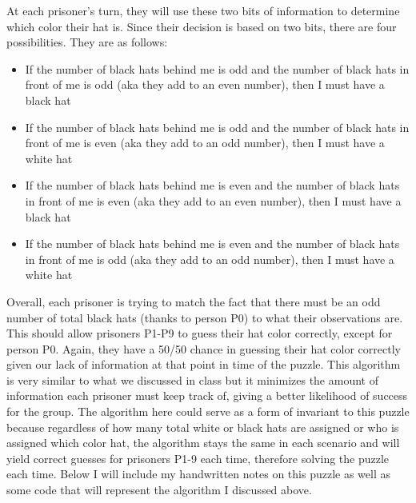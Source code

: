 \documentclass{article}
\theoremstyle{theorem}
\theoremstyle{definition}
\theoremstyle{remark}
\begin{document}
At each prisoner's turn, they will use these two bits of information to determine which color their hat is. Since their decision is based on two bits, there are four possibilities. They are as follows:
\begin{itemize}
  \item[\ding{99}] If the number of black hats behind me is odd and the number of black hats in front of me is odd (aka they add to an even number), then I must have a black hat
  \item[\ding{99}] If the number of black hats behind me is odd and the number of black hats in front of me is even (aka they add to an odd number), then I must have a white hat
  \item[\ding{99}] If the number of black hats behind me is even and the number of black hats in front of me is even (aka they add to an even number), then I must have a black hat
  \item[\ding{99}] If the number of black hats behind me is even and the number of black hats in front of me is odd (aka they add to an odd number), then I must have a white hat
\end{itemize}
Overall, each prisoner is trying to match the fact that there must be an odd number of total black hats (thanks to person P0) to what their observations are. This should allow prisoners P1-P9 to guess their hat color correctly, except for person P0. Again, they have a 50/50 chance in guessing their hat color correctly given our lack of information at that point in time of the puzzle. 
This algorithm is very similar to what we discussed in class but it minimizes the amount of information each prisoner must keep track of, giving a better likelihood of success for the group. The algorithm here could serve as a form of invariant to this puzzle because regardless of how many total white or black hats are assigned or who is assigned which color hat, the algorithm stays the same 
in each scenario and will yield correct guesses for prisoners P1-9 each time, therefore solving the puzzle each time. Below I will include my handwritten notes on this puzzle as well as some code that will represent the algorithm I discussed above. 
\end{document}
